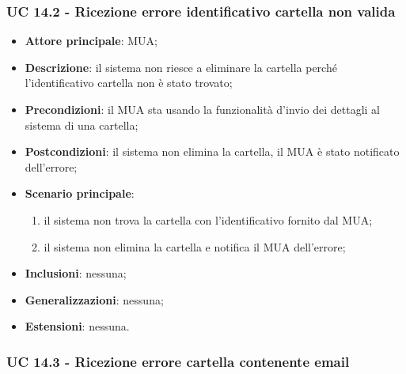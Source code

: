 \subsubsection{UC 14.2 - Ricezione errore identificativo cartella non valida} \label{sec:UC14.2}
    \begin{itemize}
        \item \textbf{Attore principale}: MUA;
        \item \textbf{Descrizione}: il sistema non riesce a eliminare la cartella perché l'identificativo cartella non è stato trovato;
        \item \textbf{Precondizioni}: il MUA sta usando la funzionalità d'invio dei dettagli al sistema di una cartella;
        \item \textbf{Postcondizioni}: il sistema non elimina la cartella, il MUA è stato notificato dell'errore;
        \item \textbf{Scenario principale}:
            \begin{enumerate}
                \item il sistema non trova la cartella con l'identificativo fornito dal MUA;
                \item il sistema non elimina la cartella e notifica il MUA dell'errore;
            \end{enumerate}
        \item \textbf{Inclusioni}: nessuna;
        \item \textbf{Generalizzazioni}: nessuna;
        \item \textbf{Estensioni}: nessuna.
    \end{itemize}
   
    \subsubsection{UC 14.3 - Ricezione errore cartella contenente email} \label{sec:UC14.3}

